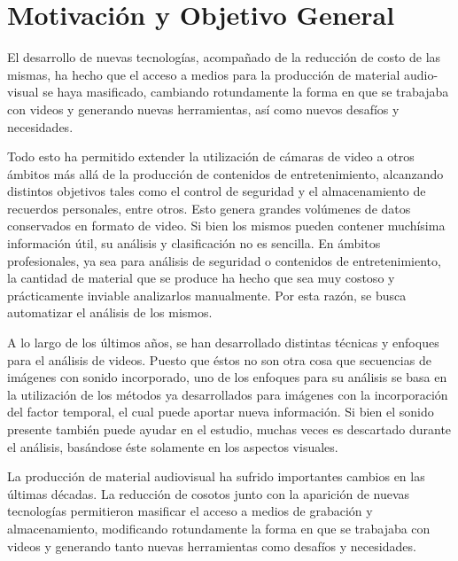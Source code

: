 \section{Motivación y Objetivo General}
\iffalse
Explique el problema o situación de referencia en el que se desarrolla la
propuesta o los interrogantes en el campo disciplinario a los que la propuesta se
dirige. Desarrolle la importancia e impacto de los objetivos y el conocimiento
que se generará. En esta sección no es necesario describir las tareas específicas
que se realizarán (para eso, ver Objetivos específicos).
\fi

El desarrollo de nuevas tecnologías, acompañado de la reducción de costo de las mismas, ha hecho que el acceso a medios para la 
producción de material audio-visual se haya masificado, cambiando rotundamente la forma en que se trabajaba con videos y generando nuevas
herramientas, así como nuevos desafíos y necesidades.

Todo esto ha permitido extender la utilización de cámaras de video a otros ámbitos más allá de la producción de contenidos de entretenimiento,
alcanzando distintos objetivos tales como el control de seguridad y el almacenamiento de recuerdos personales, entre otros.
Esto genera grandes volúmenes de datos conservados en formato de video. 
Si bien los mismos pueden contener muchísima información útil, su análisis y clasificación no es sencilla. En ámbitos profesionales,
ya sea para análisis de seguridad o contenidos de entretenimiento, la cantidad de material que se produce ha hecho que sea muy costoso y prácticamente
inviable analizarlos manualmente. Por esta razón, se busca automatizar el análisis de los mismos.

A lo largo de los últimos años, se han desarrollado distintas técnicas y enfoques para el análisis de videos.
Puesto que éstos no son otra cosa que secuencias de imágenes con sonido incorporado, uno de los enfoques para su análisis
se basa en la utilización de los métodos ya desarrollados para imágenes con la incorporación del factor temporal, el cual puede
aportar nueva información. Si bien el sonido presente también puede ayudar en el estudio, muchas veces es descartado durante el análisis,
basándose éste solamente en los aspectos visuales.

La producción de material audiovisual ha sufrido importantes cambios en las últimas décadas. La reducción de cosotos junto con la aparición de nuevas
tecnologías permitieron masificar el acceso a medios de grabación y almacenamiento, modificando rotundamente la forma en que se trabajaba con videos y
generando tanto nuevas herramientas como desafíos y necesidades.

